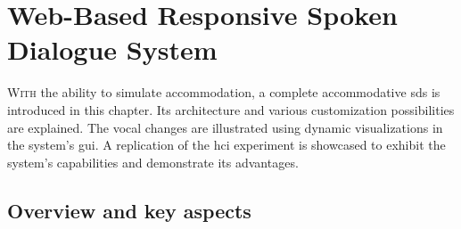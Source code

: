 \chapter{Web-Based Responsive Spoken Dialogue System}
\label{chap:web-based_responsive_spoken_dialogue_system}

\lettrine{W}{ith} the ability to simulate accommodation, a complete accommodative \acl{sds} is introduced in this chapter.
Its architecture and various customization possibilities are explained.
The vocal changes are illustrated using dynamic visualizations in the system's \acl{gui}.
A replication of the \acl{hci} experiment is showcased to exhibit the system's capabilities and demonstrate its advantages.

\pagebreak

\acresetall

\section[Overview]{Overview and key aspects}
\label{sec:overview_and_key_aspects}


